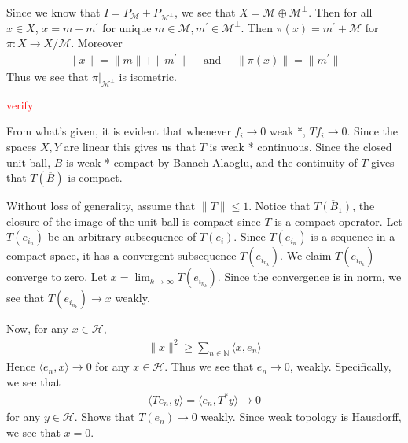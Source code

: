 \documentclass[12pt]{exam}
\theoremstyle{plain} %
\theoremstyle{definition} %
\theoremstyle{remark} %
\begin{document}
\begin{questions}
  \question
  \begin{solution}
    Since we know that $I = P_{\mathcal{M}} + P_{\mathcal{M}^\perp}$,
    we see that $X = \mathcal{M} \oplus \mathcal{M}^\perp$. Then for
    all $x \in X$, $x = m + m^\prime$ for unique $m \in \mathcal{
    M}, m^\prime \in \mathcal{M}^\perp$. Then $\pi(x) = m^\prime +
    \mathcal{M}$ for $\pi: X \to X/\mathcal{M}$. Moreover
    \begin{align*}
      \|x\| = \|m\| + \|m^\prime\| \quad \textrm{ and } \quad
      \|\pi(x)\| = \|m^\prime\|
    \end{align*}
    Thus we see that $\pi|_{\mathcal{M}^\perp}$ is isometric.
  \end{solution}

  \question
  \textcolor{red}{verify}
  \begin{solution}
    From what's given, it is evident that whenever $f_i \to 0$ weak
    *, $Tf_i \to 0$. Since the spaces $X, Y$ are linear this gives us that
    $T$ is weak * continuous. Since the closed unit ball,
    $\overline{B}$ is weak * compact by Banach-Alaoglu, and the
    continuity of $ T$ gives that $T(\overline{B})$ is compact.

  \end{solution}

  \question
  \label{q:6}
  \begin{solution}
    Without loss of generality, assume that $\|T\| \le 1$. Notice that
    $\overline{T(B_1)}$, the closure of the image of the unit ball is
    compact since $   T$ is a compact operator.
    Let $T(e_{i_n})$ be an arbitrary subsequence of $T(e_{i})$.
    Since $T(e_{i_n})$ is a sequence in a compact space, it has a
    convergent subsequence $T(e_{i_{n_k}})$.
    We claim $T(e_{i_{n_k}})$ converge to zero. Let $x = \lim_{k \to
    \infty} T(e_{i_{n_k}})$. Since the convergence is in norm, we see
    that $T(e_{i_{n_k}}) \to x$ weakly.

    Now, for any $x \in \mathcal{H}$,
    \begin{align*}
      \|x\|^2 \ge \sum_{n \in \mathbb{N}} \langle x , e_n \rangle
    \end{align*}
    Hence $\langle  e_n , x \rangle  \to 0$ for any $x \in
    \mathcal{H}$. Thus we see that $e_n \to 0$, weakly. Specifically,
    we see that
    \begin{align*}
      \langle Te_n , y \rangle  = \langle e_n , T^*y \rangle \to 0
    \end{align*}
    for any $y \in \mathcal{H}$. Shows that $T(e_n) \to 0$ weakly.
    Since weak topology is Hausdorff, we see that $x = 0$.


\end{solution}
\end{questions}
\end{document}
